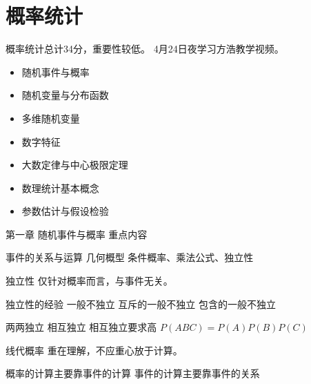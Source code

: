 \chapter{概率统计}

概率统计总计34分，重要性较低。
4月24日夜学习方浩教学视频。

\begin{itemize}
	\item 随机事件与概率
	\item 随机变量与分布函数
	\item 多维随机变量
	\item 数字特征
	\item 大数定律与中心极限定理
	\item 数理统计基本概念
	\item 参数估计与假设检验
\end{itemize}


第一章 随机事件与概率
重点内容

事件的关系与运算
几何概型
条件概率、乘法公式、独立性

独立性
仅针对概率而言，与事件无关。

独立性的经验
一般不独立
互斥的一般不独立
包含的一般不独立

两两独立  
相互独立
相互独立要求高 $P(ABC) = P(A)P(B)P(C)$

线代概率 重在理解，不应重心放于计算。


概率的计算主要靠事件的计算
事件的计算主要靠事件的关系

